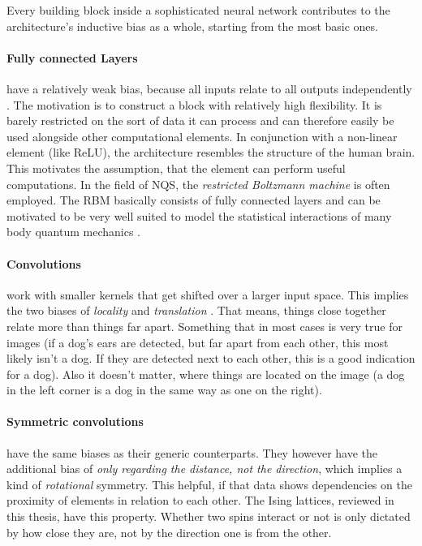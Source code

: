 Every building block inside a sophisticated neural network contributes to the architecture's inductive bias as a whole, starting from the most basic ones.

\paragraph{Fully connected Layers} have a relatively weak bias, because all inputs relate to all outputs independently \cite{relationalInductiveBiasesAndGraphNetworks}. 
The motivation is to construct a block with relatively high flexibility.
It is barely restricted on the sort of data it can process and can therefore easily be used alongside other computational elements.
In conjunction with a non-linear element (like ReLU), the architecture resembles the structure of the human brain. 
This motivates the assumption, that the element can perform useful computations.
In the field of NQS, the \emph{restricted Boltzmann machine} is often employed.
The RBM basically consists of fully connected layers and can be motivated to be very well suited to model the statistical interactions of many body quantum mechanics \cite{restrictedBoltzmanMachines}. 

\paragraph{Convolutions} work with smaller kernels that get shifted over a larger input space.
This implies the two biases of \emph{locality} and \emph{translation} \cite{relationalInductiveBiasesAndGraphNetworks}.
That means, things close together relate more than things far apart. 
Something that in most cases is very true for images (if a dog's ears are detected, but far apart from each other, this most likely isn't a dog. If they are detected next to each other, this is a good indication for a dog).
Also it doesn't matter, where things are located on the image (a dog in the left corner is a dog in the same way as one on the right).

\paragraph{Symmetric convolutions} have the same biases as their generic counterparts. They however have the additional bias of \emph{only regarding the distance, not the direction}, which implies a kind of \emph{rotational} symmetry.
This helpful, if that data shows dependencies on the proximity of elements in relation to each other. 
The Ising lattices, reviewed in this thesis, have this property. 
Whether two spins interact or not is only dictated by how close they are, not by the direction one is from the other.

